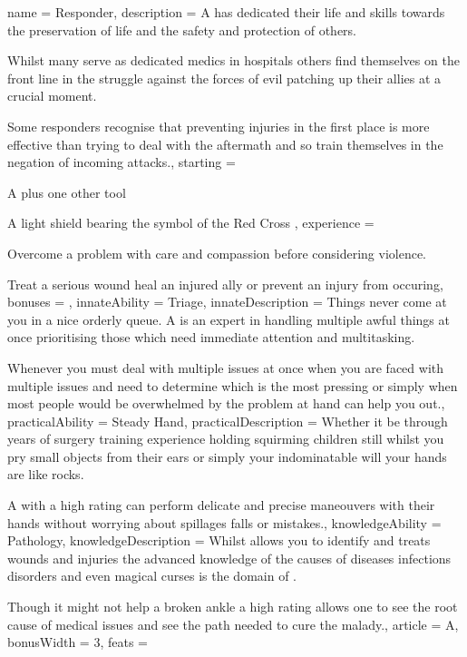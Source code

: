 \archetype
{
	name = Responder,
	description = A \bname{} has dedicated their life and skills towards the preservation of life\comma{} and the safety and protection of others. 

Whilst many serve as dedicated medics in hospitals\comma{} others find themselves on the front line in the struggle against the forces of evil\comma{} patching up their allies at a crucial moment.

Some responders recognise that preventing injuries in the first place is more effective than trying to deal with the aftermath\comma{} and so train themselves in the negation of incoming attacks.,
	starting = 
\item A \comma{} plus one other tool
\item A light shield\comma{} bearing the symbol of the Red Cross
,
	experience = \item Overcome a problem with care and  compassion before considering violence. 
\item Treat a serious wound\comma{} heal an injured ally or prevent an injury from occuring,
	bonuses = 
,
	innateAbility = Triage,
	innateDescription = Things never come at you in a nice orderly queue. A \bname{} is an expert in handling multiple awful things at once\comma{} prioritising those which need immediate attention\comma{} and multitasking. 

Whenever you must deal with multiple issues at once\comma{} when you are faced with multiple issues and need to determine which is the most pressing\comma{} or simply when most people would be overwhelmed by the problem at hand\comma{}  can help you out.,
	practicalAbility = Steady Hand,
	practicalDescription = Whether it be through years of surgery training\comma{} experience holding squirming children still whilst you pry small objects from their ears\comma{} or simply your indominatable will\comma{} your hands are like rocks. 

A \bname{} with a high  rating can perform delicate and precise maneouvers with their hands\comma{} without worrying about spillages\comma{} falls or mistakes.,
	knowledgeAbility = Pathology,
	knowledgeDescription = Whilst  allows you to identify and treats wounds and injuries\comma{} the advanced knowledge of the causes of diseases\comma{} infections\comma{} disorders and even magical curses is the domain of . 

Though it might not help a broken ankle\comma{} a high  rating allows one to see the root cause of medical issues\comma{} and see the path needed to cure the malady.,
	article = A,
	bonusWidth = 3, feats = \ResponderFeats
}

